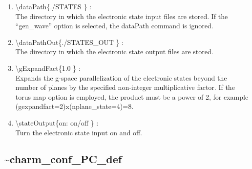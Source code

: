 \documentclass[12pt,titlepage]{article}
\begin{document}
\begin{enumerate}
  \vspace{0.15in} 
  \item \textbackslash dataPath\{./STATES \} : \\    
  The directory in which the electronic state input files are
  stored. If the ``gen\_wave'' option is selected, the dataPath
  command is ignored.
  \vspace{0.15in} 
  \item \textbackslash dataPathOut\{./STATES\_OUT \} : \\    
  The directory in which the electronic state output files are stored.
  \vspace{0.15in} 
  \item \textbackslash gExpandFact\{1.0 \} : \\    
  Expands the g-space parallelization of the electronic states beyond the number of planes by
  the specified non-integer multiplicative factor. If the torus map option is
  employed, the product must be a power of 2, for example 
 (gexpandfact=2)x(nplane\_state=4)=8.
  \vspace{0.15in} 
  \item \textbackslash stateOutput\{on: on/off \} : \\    
  Turn the electronic state input on and off.
\end{enumerate}

\newpage
\subsection*{\bf \~{ }charm\_conf\_PC\_def}
\end{document}

